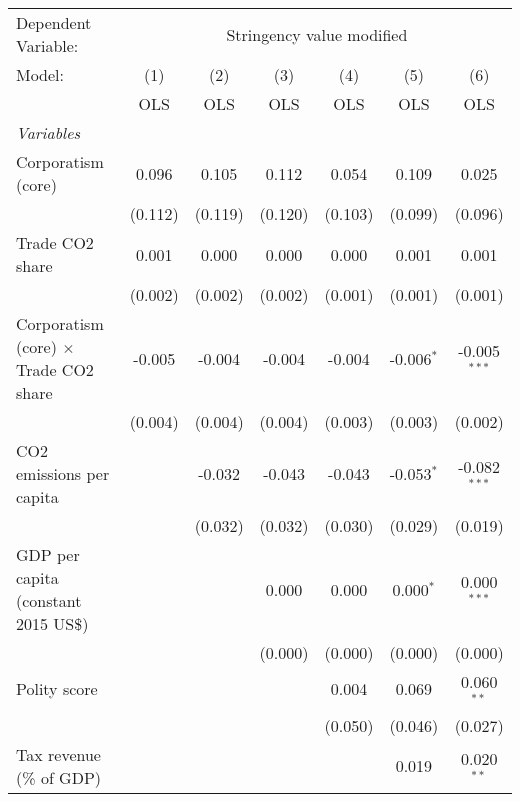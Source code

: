
\begingroup
\centering
\begin{tabular}{lcccccc}
   \toprule
   Dependent Variable: & \multicolumn{6}{c}{Stringency value modified}\\
   Model:                                       & (1)     & (2)     & (3)     & (4)     & (5)          & (6)\\  
                                                &  OLS    & OLS     & OLS     & OLS     & OLS          & OLS\\  
   \midrule
   \emph{Variables}\\
   Corporatism (core)                           & 0.096   & 0.105   & 0.112   & 0.054   & 0.109        & 0.025\\   
                                                & (0.112) & (0.119) & (0.120) & (0.103) & (0.099)      & (0.096)\\   
   Trade CO2 share                              & 0.001   & 0.000   & 0.000   & 0.000   & 0.001        & 0.001\\   
                                                & (0.002) & (0.002) & (0.002) & (0.001) & (0.001)      & (0.001)\\   
   Corporatism (core) $\times$ Trade CO2 share  & -0.005  & -0.004  & -0.004  & -0.004  & -0.006$^{*}$ & -0.005$^{***}$\\   
                                                & (0.004) & (0.004) & (0.004) & (0.003) & (0.003)      & (0.002)\\   
   CO2 emissions per capita                     &         & -0.032  & -0.043  & -0.043  & -0.053$^{*}$ & -0.082$^{***}$\\   
                                                &         & (0.032) & (0.032) & (0.030) & (0.029)      & (0.019)\\   
   GDP per capita (constant 2015 US\$)          &         &         & 0.000   & 0.000   & 0.000$^{*}$  & 0.000$^{***}$\\   
                                                &         &         & (0.000) & (0.000) & (0.000)      & (0.000)\\   
   Polity score                                 &         &         &         & 0.004   & 0.069        & 0.060$^{**}$\\   
                                                &         &         &         & (0.050) & (0.046)      & (0.027)\\   
   Tax revenue (\% of GDP)                      &         &         &         &         & 0.019        & 0.020$^{**}$\\   

\end{tabular}
